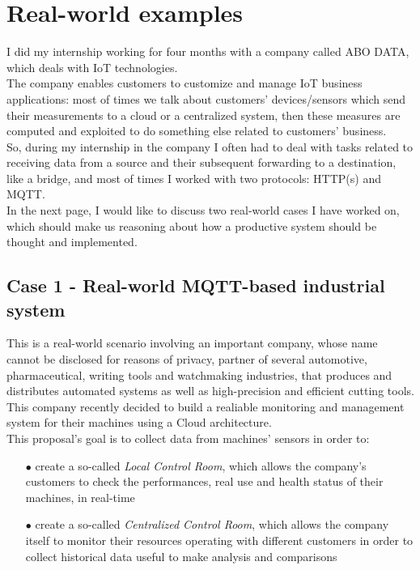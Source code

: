 \documentclass[12pt]{report}
\begin{document}
{{\chapter{Real-world examples}
\bigskip
I did my internship working for four months with a company called ABO DATA, which deals with IoT technologies.\\
The company enables customers to customize and manage IoT business applications: most of times we talk about customers' devices/sensors which send their measurements to a cloud or a centralized system, then these measures are computed and exploited to do something else related to customers' business.\\
So, during my internship in the company I often had to deal with tasks related to receiving data from a source and their subsequent forwarding to a destination, like a bridge, and most of times I worked with two protocols: HTTP(s) and MQTT.\\

In the next page, I would like to discuss two real-world cases I have worked on, which should make us reasoning about how a productive system should be thought and implemented.\\

\clearpage
\section{Case 1 - Real-world MQTT-based industrial system}
\bigskip
This is a real-world scenario involving an important company, whose name cannot be disclosed for reasons of privacy, partner of several automotive, pharmaceutical, writing tools and watchmaking industries, that produces and distributes automated systems as well as high-precision and efficient cutting tools.\\

This company recently decided to build a realiable monitoring and management system for their machines using a Cloud architecture.\\
This proposal's goal is to collect data from machines' sensors in order to:

\begin{itemize}
\setlength{\itemindent}{+4mm}
\item[$\bullet$] create a so-called \emph{Local Control Room}, which allows the company's customers to check the performances, real use and health status of their machines, in real-time
\item[$\bullet$] create a so-called \emph{Centralized Control Room}, which allows the company itself to monitor their resources operating with different customers in order to collect historical data useful to make analysis and comparisons
\end{itemize}

}}
\end{document}
